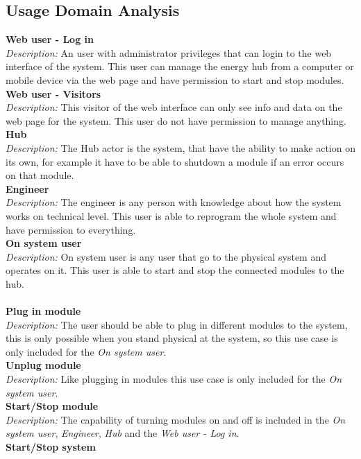 \subsection{Usage Domain Analysis}
	\textbf{Web user - Log in}
	\\\textit{Description: }
	An user with administrator privileges that can login to the web interface of the system. This user can manage the energy hub from a computer or mobile device via the web page and have permission to start and stop modules.
	\\\textbf{Web user - Visitors}
	\\\textit{Description: }
	This visitor of the web interface can only see info and data on the web page for the system. This user do not have permission to manage anything.
	\\\textbf{Hub}
	\\\textit{Description: }
	The Hub actor is the system, that have the ability to make action on its own, for example it have to be able to shutdown a module if an error occurs on that module.
	\\\textbf{Engineer}
	\\\textit{Description: }
	The engineer is any person with knowledge about how the system works on technical level. This user is able to reprogram the whole system and have permission to everything.
	\\\textbf{On system user}
	\\\textit{Description: }
	On system user is any user that go to the physical system and operates on it. This user is able to start and stop the connected modules to the hub.
	\\\\\textbf{Plug in module}
	\\\textit{Description: }
	The user should be able to plug in different modules to the system, this is only possible when you stand physical at the system, so this use case is only included for the	\textit{On system user}.
	\\\textbf{Unplug module}
	\\\textit{Description: }
	Like plugging in modules this use case is only included for the \textit{On system user}.
	\\\textbf{Start/Stop module}
	\\\textit{Description: }
	The capability of turning modules on and off is included in the \textit{On system user}, \textit{Engineer}, \textit{Hub} and the \textit{Web user - Log in}.
	\\\textbf{Start/Stop system}
